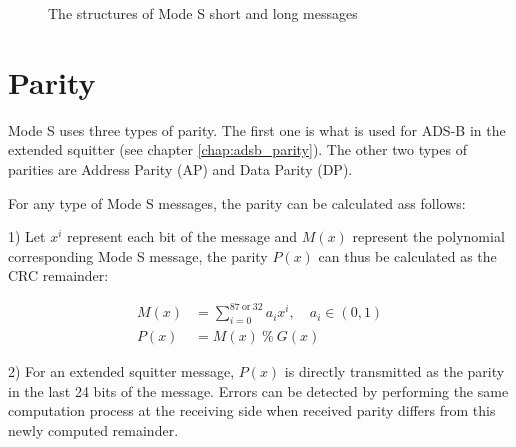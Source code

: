 \begin{figure}[!ht]
  \centering
  \caption{The structures of Mode S short and long messages}
  \label{fig:modes_msg_structures}
\end{figure}




\section{Parity} \label{sec:parity}

Mode S uses three types of parity. The first one is what is used for ADS-B in the extended squitter (see chapter \ref{chap:adsb_parity}). The other two types of parities are Address Parity (AP) and Data Parity (DP).

For any type of Mode S messages, the parity can be calculated ass follows:

1) Let  $x^{i}$ represent each bit of the message and $M(x)$ represent the polynomial corresponding Mode S message, the parity $P(x)$ can thus be calculated as the CRC remainder:

\begin{equation} \label{eq:crc}
  \begin{split}
    M(x) &= \sum_{i=0}^{87~\mathrm{or}~32} a_i x^i , \quad a_i \in (0, 1)\\
    P(x) &= M(x) ~ \% ~ G(x)
  \end{split}
\end{equation}

2) For an extended squitter message, $P(x)$ is directly transmitted as the parity in the last 24 bits of the message. Errors can be detected by performing the same computation process at the receiving side when received parity differs from this newly computed remainder.

